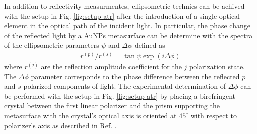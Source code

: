 In addition to reflectivity measurmentes, ellipsometric technics can be achived  with the setup in Fig. \ref{fig:setup-atr} after the introduction of a single optical element in the optical path of the incident light. In particular, the phase change of the reflected light by a AuNPs metasurface can be determine with the spectra of the  ellipsometric parameters $\psi$ and $\Delta\phi$ defined as
%
\begin{align}
	{r^{(p)}}/{r^{(s)}} = \tan\psi \exp(i \Delta\phi)
	\label{eq:ellipso}
\end{align}
%
where $r^{(j)}$ are the reflection amplitude coefficient for the $j$ polarization state. The $\Delta\phi$ parameter corresponds to the phase difference between the reflected $p$ and $s$ polarized components of light. The experimental determination of $\Delta\phi$ can be performed with the setup in Fig. \ref{fig:setup-atr} by placing a birefringent crystal between the first linear polarizer and the prism supporting the metasurface with the crystal's optical axis is oriented at $45^\circ$ with respect to polarizer's axis as described in Ref. \cite{cuanalo_phase_2024}.
